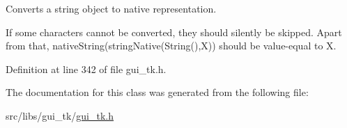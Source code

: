 Converts a string object to native representation. 

If some characters cannot be converted, they should silently be skipped. Apart from that, {\ttfamily native\-String}(string\-Native(String(),X)) should be value-\/equal to {\ttfamily X}. 

Definition at line 342 of file gui\-\_\-tk.\-h.



The documentation for this class was generated from the following file\-:\begin{DoxyCompactItemize}
\item 
src/libs/gui\-\_\-tk/\hyperlink{gui__tk_8h}{gui\-\_\-tk.\-h}\end{DoxyCompactItemize}
